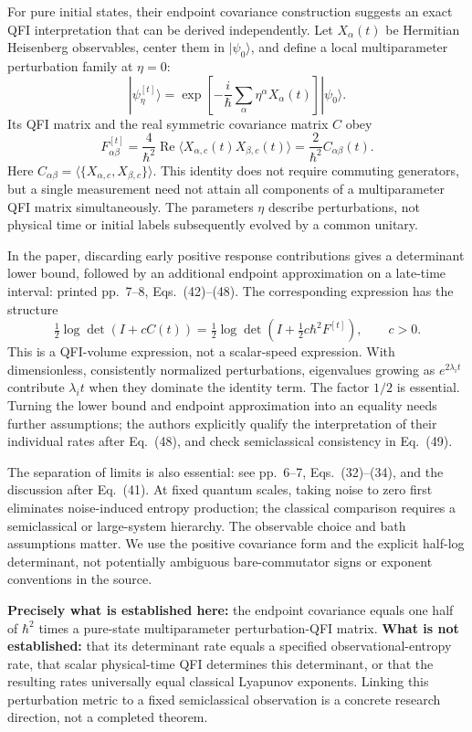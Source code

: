 \documentclass[11pt,a4paper]{article}
\begin{document}
For pure initial states, their endpoint covariance construction suggests an exact QFI interpretation that can be derived independently. Let $X_\alpha(t)$ be Hermitian Heisenberg observables, center them in $|\psi_0\rangle$, and define a local multiparameter perturbation family at $\eta=0$:
\[|\psi_\eta^{[t]}\rangle=\exp\!\left[-\frac{i}{\hbar}\sum_\alpha\eta^\alpha X_\alpha(t)\right]|\psi_0\rangle.\]
Its QFI matrix and the real symmetric covariance matrix $C$ obey
\[F_{\alpha\beta}^{[t]}=\frac4{\hbar^2}\operatorname{Re}\langle X_{\alpha,c}(t)X_{\beta,c}(t)\rangle=\frac2{\hbar^2}C_{\alpha\beta}(t).\]
Here $C_{\alpha\beta}=\langle\{X_{\alpha,c},X_{\beta,c}\}\rangle$. This identity does not require commuting generators, but a single measurement need not attain all components of a multiparameter QFI matrix simultaneously. The parameters $\eta$ describe perturbations, not physical time or initial labels subsequently evolved by a common unitary.

In the paper, discarding early positive response contributions gives a determinant lower bound, followed by an additional endpoint approximation on a late-time interval: printed pp.~7--8, Eqs.~(42)--(48). The corresponding expression has the structure
\[\tfrac12\log\det(I+cC(t))=\tfrac12\log\det\!\left(I+\tfrac12c\hbar^2F^{[t]}\right),\qquad c>0.\]
This is a QFI-volume expression, not a scalar-speed expression. With dimensionless, consistently normalized perturbations, eigenvalues growing as $e^{2\lambda_it}$ contribute $\lambda_it$ when they dominate the identity term. The factor $1/2$ is essential. Turning the lower bound and endpoint approximation into an equality needs further assumptions; the authors explicitly qualify the interpretation of their individual rates after Eq.~(48), and check semiclassical consistency in Eq.~(49).

The separation of limits is also essential: see pp.~6--7, Eqs.~(32)--(34), and the discussion after Eq.~(41). At fixed quantum scales, taking noise to zero first eliminates noise-induced entropy production; the classical comparison requires a semiclassical or large-system hierarchy. The observable choice and bath assumptions matter. We use the positive covariance form and the explicit half-log determinant, not potentially ambiguous bare-commutator signs or exponent conventions in the source.

\textbf{Precisely what is established here:} the endpoint covariance equals one half of $\hbar^2$ times a pure-state multiparameter perturbation-QFI matrix. \textbf{What is not established:} that its determinant rate equals a specified observational-entropy rate, that scalar physical-time QFI determines this determinant, or that the resulting rates universally equal classical Lyapunov exponents. Linking this perturbation metric to a fixed semiclassical observation is a concrete research direction, not a completed theorem.
\end{document}

